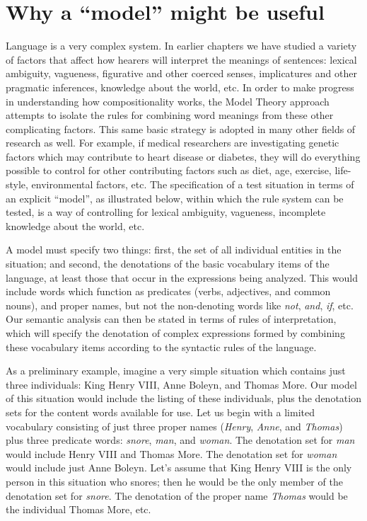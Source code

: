 \section{Why a “model” might be useful}\label{sec:} %

Language is a very complex system. In earlier chapters we have studied a variety of factors that affect how hearers will interpret the meanings of sentences: lexical ambiguity, vagueness, figurative and other coerced senses, implicatures and other pragmatic inferences, knowledge about the world, etc. In order to make progress in understanding how compositionality works, the Model Theory approach attempts to isolate the rules for combining word meanings from these other complicating factors. This same basic strategy is adopted in many other fields of research as well. For example, if medical researchers are investigating genetic factors which may contribute to heart disease or diabetes, they will do everything possible to control for other contributing factors such as diet, age, exercise, life-style, environmental factors, etc. The specification of a test situation in terms of an explicit “model”, as illustrated below, within which the rule system can be tested, is a way of controlling for lexical ambiguity, vagueness, incomplete knowledge about the world, etc.



A model must specify two things: first, the set of all individual entities in the situation; and second, the denotations of the basic vocabulary items of the language, at least those that occur in the expressions being analyzed. This would include words which function as predicates (verbs, adjectives, and common nouns), and proper names, but not the non-denoting words like \textit{not}, \textit{and}, \textit{if}, etc. Our semantic analysis can then be stated in terms of rules of interpretation, which will specify the denotation of complex expressions formed by combining these vocabulary items according to the syntactic rules of the language.



As a preliminary example, imagine a very simple situation which contains just three individuals: King Henry VIII, Anne Boleyn, and Thomas More. Our model of this situation would include the listing of these individuals, plus the denotation sets for the content words available for use. Let us begin with a limited vocabulary consisting of just three proper names (\textit{Henry}, \textit{Anne}, and \textit{Thomas}) plus three predicate words: \textit{snore}, \textit{man}, and \textit{woman}. The denotation set for \textit{man} would include Henry VIII and Thomas More. The denotation set for \textit{woman} would include just Anne Boleyn. Let’s assume that King Henry VIII is the only person in this situation who snores; then he would be the only member of the denotation set for \textit{snore}. The denotation of the proper name \textit{Thomas} would be the individual Thomas More, etc.



